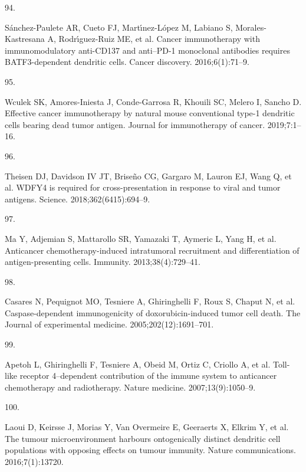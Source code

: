\documentclass[
]{article}
\newlength{\cslhangindent}
\newlength{\csllabelwidth}
\newenvironment{CSLReferences}[2] %
 {\begin{list}{}{%
  \setlength{\itemindent}{0pt}
  \setlength{\leftmargin}{0pt}
  \setlength{\parsep}{0pt}
  \ifodd #1
   \setlength{\leftmargin}{\cslhangindent}
   \setlength{\itemindent}{-1\cslhangindent}
  \fi
  \setlength{\itemsep}{#2\baselineskip}}}
 {\end{list}}
\newcommand{\CSLLeftMargin}[1]{\parbox[t]{\csllabelwidth}{\strut#1\strut}}
\newcommand{\CSLRightInline}[1]{\parbox[t]{\linewidth - \csllabelwidth}{\strut#1\strut}}
\begin{document}
\begin{CSLReferences}{0}{1}
\CSLLeftMargin{94. }%
\CSLRightInline{Sánchez-Paulete AR, Cueto FJ, Martı́nez-López M, Labiano
S, Morales-Kastresana A, Rodrı́guez-Ruiz ME, et al. Cancer immunotherapy
with immunomodulatory anti-CD137 and anti--PD-1 monoclonal antibodies
requires BATF3-dependent dendritic cells. Cancer discovery.
2016;6(1):71--9. }

\CSLLeftMargin{95. }%
\CSLRightInline{Wculek SK, Amores-Iniesta J, Conde-Garrosa R, Khouili
SC, Melero I, Sancho D. Effective cancer immunotherapy by natural mouse
conventional type-1 dendritic cells bearing dead tumor antigen. Journal
for immunotherapy of cancer. 2019;7:1--16. }

\CSLLeftMargin{96. }%
\CSLRightInline{Theisen DJ, Davidson IV JT, Briseño CG, Gargaro M,
Lauron EJ, Wang Q, et al. WDFY4 is required for cross-presentation in
response to viral and tumor antigens. Science. 2018;362(6415):694--9. }

\CSLLeftMargin{97. }%
\CSLRightInline{Ma Y, Adjemian S, Mattarollo SR, Yamazaki T, Aymeric L,
Yang H, et al. Anticancer chemotherapy-induced intratumoral recruitment
and differentiation of antigen-presenting cells. Immunity.
2013;38(4):729--41. }

\CSLLeftMargin{98. }%
\CSLRightInline{Casares N, Pequignot MO, Tesniere A, Ghiringhelli F,
Roux S, Chaput N, et al. Caspase-dependent immunogenicity of
doxorubicin-induced tumor cell death. The Journal of experimental
medicine. 2005;202(12):1691--701. }

\CSLLeftMargin{99. }%
\CSLRightInline{Apetoh L, Ghiringhelli F, Tesniere A, Obeid M, Ortiz C,
Criollo A, et al. Toll-like receptor 4--dependent contribution of the
immune system to anticancer chemotherapy and radiotherapy. Nature
medicine. 2007;13(9):1050--9. }

\CSLLeftMargin{100. }%
\CSLRightInline{Laoui D, Keirsse J, Morias Y, Van Overmeire E, Geeraerts
X, Elkrim Y, et al. The tumour microenvironment harbours ontogenically
distinct dendritic cell populations with opposing effects on tumour
immunity. Nature communications. 2016;7(1):13720. }

\end{CSLReferences}
\end{document}
